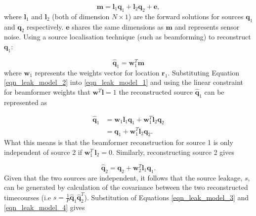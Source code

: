 \begin{equation}
\mathbf{m} = \mathbf{l}_1\mathbf{q}_1+\mathbf{l}_2\mathbf{q}_2 + \mathbf{e}, \label{eqn_leak_model_1}
\end{equation} where $\mathbf{l}_1$ and $\mathbf{l}_2$ (both of dimension $N \times 1$) are the forward solutions for sources $\mathbf{q}_1$ and $\mathbf{q}_2$ respectively. $\mathbf{e}$ shares the same dimensions as $\mathbf{m}$ and represents sensor noise. Using a source localisation technique (such as beamforming) to reconstruct $\mathbf{q}_1$:

\begin{equation}
\hat{\mathbf{q}}_1 = \mathbf{w}_1^T\mathbf{m} \label{eqn_leak_model_2}
\end{equation} where $\mathbf{w}_1$ represents the weights vector for location $\mathbf{r}_1$. Substituting Equation \ref{eqn_leak_model_2} into \ref{eqn_leak_model_1} and using the linear constraint for beamformer weights that $\mathbf{w}^T\mathbf{l} = 1$ the reconstructed source $\hat{\mathbf{q}}_1$ can be represented as

\begin{equation}
	\begin{aligned}
	\hat{\mathbf{q}}_1 &= \mathbf{w}_1\mathbf{l}_1\mathbf{q}_1 + \mathbf{w}_1^T\mathbf{l}_2\mathbf{q}_2 \\
	&= \mathbf{q}_1 + \mathbf{w}_1^T\mathbf{l}_2\mathbf{q}_2.
	\end{aligned}\label{eqn_leak_model_3}
\end{equation} What this means is that the beamformer reconstruction for source 1 is only independent of source 2 if $\mathbf{w}^T_1\,\mathbf{l}_2=0$. Similarly, reconstructing source 2 gives

\begin{equation}
\hat{\mathbf{q}}_2 = \mathbf{q}_2 + \mathbf{w}_2^T\mathbf{l}_1\mathbf{q}_1.\label{eqn_leak_model_4}
\end{equation} Given that the two sources are independent, it follows that the source leakage, $s$, can be generated by calculation of the covariance between the two reconstructed timecourses (i.e $s=\tfrac{1}{P}\hat{\mathbf{q}}_1\hat{\mathbf{q}}_2^T$). Substitution of Equations \ref{eqn_leak_model_3} and \ref{eqn_leak_model_4} gives

